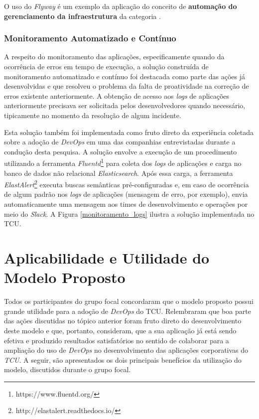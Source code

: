 O uso do {\it Flyway} é um exemplo da aplicação do conceito de {\bf automação do
gerenciamento da infraestrutura} da categoria .

\subsubsection{Monitoramento Automatizado e Contínuo}

A respeito do monitoramento das aplicações, especificamente quando da ocorrência
de erros em tempo de execução, a solução construída de
monitoramento automatizado e contínuo foi destacada como parte das ações já
desenvolvidas e que resolveu o problema da falta de proatividade na correção de
erros existente anteriormente. A obtenção de acesso aos {\it logs} de aplicações
anteriormente precisava ser solicitada pelos desenvolvedores quando necessário,
tipicamente no momento da resolução de algum incidente.

Esta solução também foi implementada como fruto direto da experiência
coletada sobre a adoção de {\it DevOps} em uma das companhias entrevistadas
durante a condução desta pesquisa. A solução envolve a execução de um
procedimento utilizando a ferramenta {\it Fluentd}\footnote{https://www.fluentd.org/}
para coleta dos {\it logs} de aplicações e carga no banco de dados não
relacional {\it Elasticsearch}. Após essa carga, a ferramenta {\it ElastAlert}\footnote{http://elastalert.readthedocs.io/}
executa buscas semânticas pré-configuradas e, em caso de ocorrência de algum
padrão nos {\it logs} de aplicações (mensagem de erro, por exemplo), envia
automaticamente uma mensagem aos times de desenvolvimento e operações por meio
do {\it Slack}. A Figura \ref{monitoramento_logs} ilustra a solução
implementada no \acrshort{TCU}.


\section{Aplicabilidade e Utilidade do Modelo Proposto}

Todos os participantes do grupo focal concordaram que o modelo proposto possui
grande utilidade para a adoção de {\it DevOps} do \acrshort{TCU}. Relembraram
que boa parte das ações discutidas no tópico anterior foram fruto direto do
desenvolvimento deste modelo e que, portanto, consideram, que a sua aplicação
já está sendo efetiva e produzido resultados satisfatórios no sentido de colaborar
para a ampliação do uso de {\it DevOps} no desenvolvimento das aplicações
corporativas do {\it TCU}. A seguir, são apresentados os dois principais
benefícios da utilização do modelo, discutidos durante o grupo focal.

